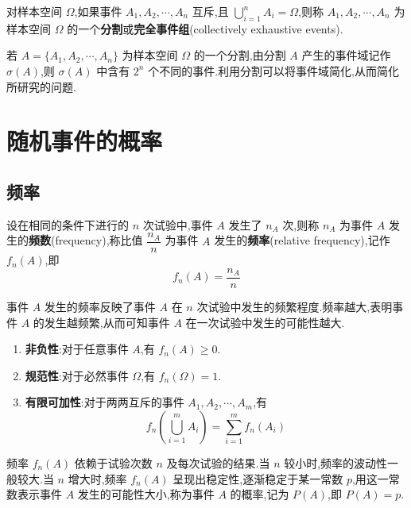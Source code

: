 \begin{definition}
    \indent 对样本空间 $\varOmega$,如果事件 $A_1,A_2,\cdots,A_n$ 互斥,且 $\displaystyle\bigcup_{i=1}^n A_i=\varOmega$,则称 $A_1,A_2,\cdots,A_n$ 为样本空间 $\varOmega$ 的一个\textbf{分割}或\textbf{完全事件组}(collectively exhaustive events).
\end{definition}

若 $A = \{ A_1,A_2,\cdots,A_n \}$ 为样本空间 $\varOmega$ 的一个分割,由分割 $A$ 产生的事件域记作 $\sigma(A)$,则 $\sigma(A)$ 中含有 $2^n$ 个不同的事件.利用分割可以将事件域简化,从而简化所研究的问题.

\section{随机事件的概率}

\subsection{频率}

\begin{definition}
    \indent 设在相同的条件下进行的 $n$ 次试验中,事件 $A$ 发生了 $n_A$ 次,则称 $n_A$ 为事件 $A$ 发生的\textbf{频数}(frequency),称比值 $\dfrac{n_A}{n}$ 为事件 $A$ 发生的\textbf{频率}(relative frequency),记作 $f_n(A)$,即
    $$
    f_n(A)=\dfrac{n_A}{n}
    $$
\end{definition}

事件 $A$ 发生的频率反映了事件 $A$ 在 $n$ 次试验中发生的频繁程度.频率越大,表明事件 $A$ 的发生越频繁,从而可知事件 $A$ 在一次试验中发生的可能性越大.

\begin{property}[][频率的基本性质]
    \begin{enumerate}
        \item \textbf{非负性}:对于任意事件 $A$,有 $f_n(A) \geqslant 0$.
        \item \textbf{规范性}:对于必然事件 $\varOmega$,有 $f_n(\varOmega)=1$.
        \item \textbf{有限可加性}:对于两两互斥的事件 $A_1,A_2,\cdots,A_m$,有
        $$
        f_n \left(\bigcup_{i=1}^m A_i \right) = \sum_{i=1}^m f_n(A_i)
        $$
    \end{enumerate}
\end{property}

频率 $f_n(A)$ 依赖于试验次数 $n$ 及每次试验的结果.当 $n$ 较小时,频率的波动性一般较大.当 $n$ 增大时,频率 $f_n(A)$ 呈现出稳定性,逐渐稳定于某一常数 $p$,用这一常数表示事件 $A$ 发生的可能性大小,称为事件 $A$ 的概率,记为 $P(A)$,即 $P(A)=p$.

